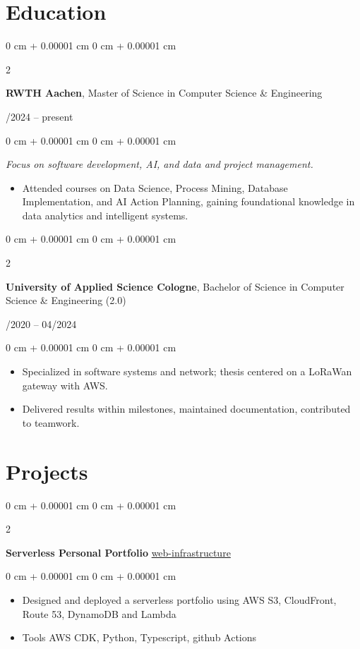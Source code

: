 \documentclass[10pt, letterpaper]{article}
\newenvironment{highlights}{
    \begin{itemize}[
        topsep=0.10 cm,
        parsep=0.10 cm,
        partopsep=0pt,
        itemsep=0pt,
        leftmargin=0 cm + 10pt
    ]
}{
    \end{itemize}
} %
\newenvironment{onecolentry}{
    \begin{adjustwidth}{
        0 cm + 0.00001 cm
    }{
        0 cm + 0.00001 cm
    }
}{
    \end{adjustwidth}
} %
\newenvironment{twocolentry}[2][]{
    \onecolentry
    \def\secondColumn{#2}
    \setcolumnwidth{\fill, 4.5 cm}
    \begin{paracol}{2}
}{
    \switchcolumn \raggedleft \secondColumn
    \end{paracol}
    \endonecolentry
} %
\begin{document}
    \vspace{0.2cm}




  \section{Education}
\begin{twocolentry}{04/2024 -- present}
\textbf{RWTH Aachen}, Master of Science in Computer Science \& Engineering
\end{twocolentry}
\begin{onecolentry}
\textit{Focus on software development, AI, and data and project management.}
\begin{highlights}
    \item Attended courses on Data Science, Process Mining, Database Implementation, and AI Action Planning, gaining foundational knowledge in data analytics and intelligent systems.
    \end{highlights}
\end{onecolentry}

\vspace{0.1cm}

\begin{twocolentry}{09/2020 -- 04/2024}
\textbf{University of Applied Science Cologne}, Bachelor of Science in Computer Science \& Engineering (2.0)
\end{twocolentry}
\begin{onecolentry}
\begin{highlights}
\item Specialized in software systems and network; thesis centered on a LoRaWan gateway with AWS.
\item Delivered results within milestones, maintained documentation, contributed to teamwork.
\end{highlights}
\end{onecolentry}

    \section{Projects}        
        \begin{twocolentry}{
           \href{https://github.com/aalhousseini/web-infrastructure}{web-infrastructure}
        }
            \textbf{Serverless Personal Portfolio}\end{twocolentry}
        \vspace{0.10 cm}
        \begin{onecolentry}
            \begin{highlights}
                \item Designed and deployed a serverless portfolio using AWS S3, CloudFront, Route 53, DynamoDB and Lambda
                \item Tools AWS CDK, Python, Typescript, github Actions
            \end{highlights}
        \end{onecolentry}
\end{document}
